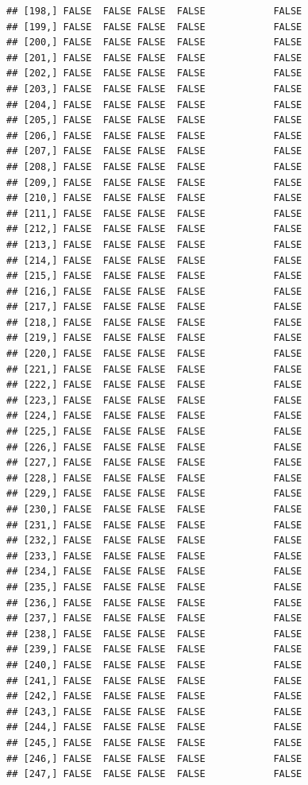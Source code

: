 \documentclass[
  english,
  man,floatsintext]{apa6}
\begin{document}
\begin{verbatim}
## [198,] FALSE  FALSE FALSE  FALSE            FALSE
## [199,] FALSE  FALSE FALSE  FALSE            FALSE
## [200,] FALSE  FALSE FALSE  FALSE            FALSE
## [201,] FALSE  FALSE FALSE  FALSE            FALSE
## [202,] FALSE  FALSE FALSE  FALSE            FALSE
## [203,] FALSE  FALSE FALSE  FALSE            FALSE
## [204,] FALSE  FALSE FALSE  FALSE            FALSE
## [205,] FALSE  FALSE FALSE  FALSE            FALSE
## [206,] FALSE  FALSE FALSE  FALSE            FALSE
## [207,] FALSE  FALSE FALSE  FALSE            FALSE
## [208,] FALSE  FALSE FALSE  FALSE            FALSE
## [209,] FALSE  FALSE FALSE  FALSE            FALSE
## [210,] FALSE  FALSE FALSE  FALSE            FALSE
## [211,] FALSE  FALSE FALSE  FALSE            FALSE
## [212,] FALSE  FALSE FALSE  FALSE            FALSE
## [213,] FALSE  FALSE FALSE  FALSE            FALSE
## [214,] FALSE  FALSE FALSE  FALSE            FALSE
## [215,] FALSE  FALSE FALSE  FALSE            FALSE
## [216,] FALSE  FALSE FALSE  FALSE            FALSE
## [217,] FALSE  FALSE FALSE  FALSE            FALSE
## [218,] FALSE  FALSE FALSE  FALSE            FALSE
## [219,] FALSE  FALSE FALSE  FALSE            FALSE
## [220,] FALSE  FALSE FALSE  FALSE            FALSE
## [221,] FALSE  FALSE FALSE  FALSE            FALSE
## [222,] FALSE  FALSE FALSE  FALSE            FALSE
## [223,] FALSE  FALSE FALSE  FALSE            FALSE
## [224,] FALSE  FALSE FALSE  FALSE            FALSE
## [225,] FALSE  FALSE FALSE  FALSE            FALSE
## [226,] FALSE  FALSE FALSE  FALSE            FALSE
## [227,] FALSE  FALSE FALSE  FALSE            FALSE
## [228,] FALSE  FALSE FALSE  FALSE            FALSE
## [229,] FALSE  FALSE FALSE  FALSE            FALSE
## [230,] FALSE  FALSE FALSE  FALSE            FALSE
## [231,] FALSE  FALSE FALSE  FALSE            FALSE
## [232,] FALSE  FALSE FALSE  FALSE            FALSE
## [233,] FALSE  FALSE FALSE  FALSE            FALSE
## [234,] FALSE  FALSE FALSE  FALSE            FALSE
## [235,] FALSE  FALSE FALSE  FALSE            FALSE
## [236,] FALSE  FALSE FALSE  FALSE            FALSE
## [237,] FALSE  FALSE FALSE  FALSE            FALSE
## [238,] FALSE  FALSE FALSE  FALSE            FALSE
## [239,] FALSE  FALSE FALSE  FALSE            FALSE
## [240,] FALSE  FALSE FALSE  FALSE            FALSE
## [241,] FALSE  FALSE FALSE  FALSE            FALSE
## [242,] FALSE  FALSE FALSE  FALSE            FALSE
## [243,] FALSE  FALSE FALSE  FALSE            FALSE
## [244,] FALSE  FALSE FALSE  FALSE            FALSE
## [245,] FALSE  FALSE FALSE  FALSE            FALSE
## [246,] FALSE  FALSE FALSE  FALSE            FALSE
## [247,] FALSE  FALSE FALSE  FALSE            FALSE

\end{verbatim}
\end{document}
